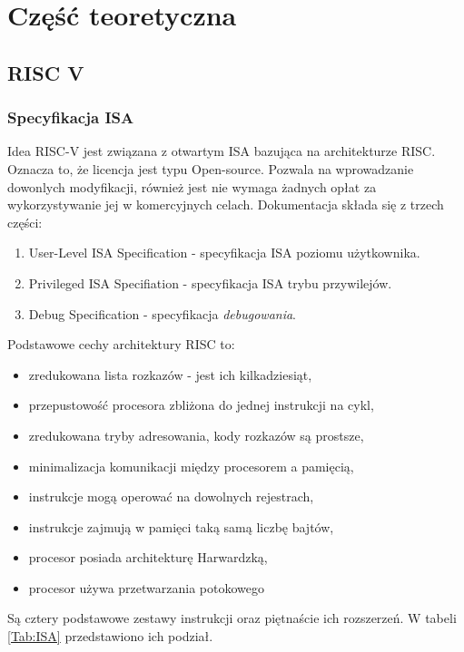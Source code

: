 \documentclass[11pt,a4paper]{article}
\begin{document}
\section{Część teoretyczna}

	\subsection{RISC V}

		\subsubsection{Specyfikacja ISA}
		\hspace{5mm}
		Idea RISC-V jest związana z otwartym ISA bazująca na architekturze RISC. Oznacza to, że licencja jest typu Open-source. Pozwala na wprowadzanie dowonlych modyfikacji\cite{open_source}, również jest nie wymaga żadnych opłat za wykorzystywanie jej w komercyjnych celach. Dokumentacja składa się z trzech części\cite{isa_site}:
		\begin{enumerate}
			\item User-Level ISA Specification - specyfikacja ISA poziomu użytkownika.
			\item Privileged ISA Specifiation - specyfikacja ISA trybu przywilejów.
			\item Debug Specification - specyfikacja \textit{debugowania}. 
		\end{enumerate}
		Podstawowe cechy architektury RISC to:
		\begin{itemize}
		\item zredukowana lista rozkazów - jest ich kilkadziesiąt,
		\item przepustowość procesora zbliżona do jednej instrukcji na cykl,
		\item zredukowana tryby adresowania, kody rozkazów są prostsze,
		\item minimalizacja komunikacji między procesorem a pamięcią,
		\item instrukcje mogą operować na dowolnych rejestrach,
		\item instrukcje zajmują w pamięci taką samą liczbę bajtów,
		\item procesor posiada architekturę Harwardzką,
		\item procesor używa przetwarzania potokowego
		\end{itemize}
		Są cztery podstawowe zestawy instrukcji oraz piętnaście ich rozszerzeń. W tabeli \ref{Tab:ISA} przedstawiono ich podział.\\
\end{document}

